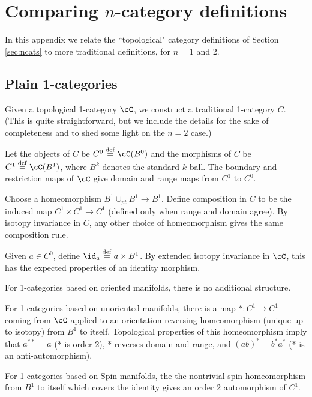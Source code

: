 
\section{Comparing $n$-category definitions}
\label{sec:comparing-defs}

In this appendix we relate the ``topological" category definitions of Section \ref{sec:ncats}
to more traditional definitions, for $n=1$ and 2.

\subsection{Plain 1-categories}

Given a topological 1-category $\cC$, we construct a traditional 1-category $C$.
(This is quite straightforward, but we include the details for the sake of completeness and
to shed some light on the $n=2$ case.)

Let the objects of $C$ be $C^0 \deq \cC(B^0)$ and the morphisms of $C$ be $C^1 \deq \cC(B^1)$, 
where $B^k$ denotes the standard $k$-ball.
The boundary and restriction maps of $\cC$ give domain and range maps from $C^1$ to $C^0$.

Choose a homeomorphism $B^1\cup_{pt}B^1 \to B^1$.
Define composition in $C$ to be the induced map $C^1\times C^1 \to C^1$ (defined only when range and domain agree).
By isotopy invariance in $C$, any other choice of homeomorphism gives the same composition rule.

Given $a\in C^0$, define $\id_a \deq a\times B^1$.
By extended isotopy invariance in $\cC$, this has the expected properties of an identity morphism.


\medskip

For 1-categories based on oriented manifolds, there is no additional structure.

For 1-categories based on unoriented manifolds, there is a map $*:C^1\to C^1$
coming from $\cC$ applied to an orientation-reversing homeomorphism (unique up to isotopy) 
from $B^1$ to itself.
Topological properties of this homeomorphism imply that 
$a^{**} = a$ (* is order 2), * reverses domain and range, and $(ab)^* = b^*a^*$
(* is an anti-automorphism).

For 1-categories based on Spin manifolds,
the the nontrivial spin homeomorphism from $B^1$ to itself which covers the identity
gives an order 2 automorphism of $C^1$.

